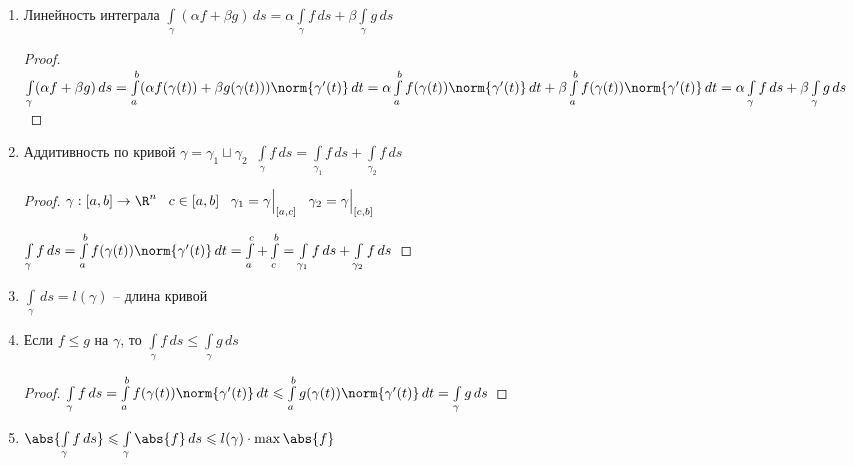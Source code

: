 \begin{properties}
\begin{enumerate}[1.]
		\item
		Линейность интеграла $\int\limits_{\gamma} (\alpha f + \beta g) \,ds = \alpha \int\limits_{\gamma} f \,ds + \beta \int\limits_{\gamma} g \,ds$
		
		\begin{proof}\thmslashn
			
			$\int\limits_{\gamma} (\alpha f + \beta g) \,ds = \int\limits_{a}^{b} (\alpha f(\gamma(t)) + \beta g(\gamma(t)) ) \norm{\gamma'(t)} \,dt = \alpha \int\limits_{a}^{b} f(\gamma(t)) \norm{\gamma'(t)} \,dt + \beta \int\limits_{a}^{b} f(\gamma(t)) \norm{\gamma'(t)} \,dt = \alpha \int\limits_{\gamma} f \,ds + \beta \int\limits_{\gamma} g \,ds$
	
		\end{proof}

		\item 
		Аддитивность по кривой $\gamma = \gamma_1 \sqcup \gamma_2 \;\; \int\limits_{\gamma} f\,ds = \int\limits_{\gamma_1} f\,ds + \int\limits_{\gamma_2} f\,ds$
		
		\begin{proof}\thmslashn
			
            $\gamma:[a,b] \to \R^n \;\;\; c\in [a, b] \;\;\; \gamma_1 = \gamma\Big|_{[a, c]}\;\;\;\gamma_2 = \gamma\Big|_{[c, b]}$
			
			$\int\limits_{\gamma} f\,ds = \int\limits_{a}^{b} f(\gamma(t)) \norm{\gamma'(t)} \,dt = \int\limits_{a}^{c} + \int\limits_{c}^{b} = \int\limits_{\gamma_1} f\,ds + \int\limits_{\gamma_2} f\,ds $
			
		\end{proof}

		\item
		$\int\limits_{\gamma}\,ds = l(\gamma)$ -- длина кривой
		
		\item
		Если $f \leqslant g$ на $\gamma$, то $\int\limits_{\gamma} f\,ds \leqslant \int\limits_{\gamma}g\,ds$
		
		
		\begin{proof}\thmslashn
			
			$\int\limits_{\gamma} f\,ds = \int\limits_{a}^{b} f(\gamma(t)) \norm{\gamma'(t)} \,dt \leqslant \int\limits_{a}^{b} g(\gamma(t)) \norm{\gamma'(t)} \,dt = \int\limits_{\gamma} g\,ds$
			
		\end{proof}
	
		\item
		$\abs{\int\limits_{\gamma} f\,ds} \leqslant \int\limits_{\gamma}\abs{f}\,ds \leqslant l(\gamma) \cdot \max\abs{f}$
	

\end{enumerate}
\end{properties}

